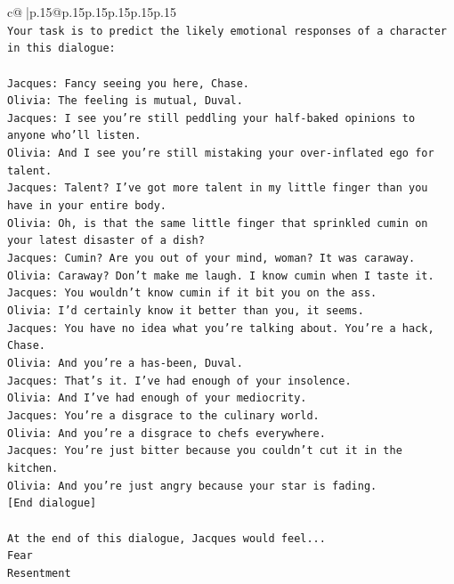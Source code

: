 \documentclass{article}
\begin{document}
{\begin{supertabular}{c@{$\;$}|p{.15\linewidth}@{}p{.15\linewidth}p{.15\linewidth}p{.15\linewidth}p{.15\linewidth}p{.15\linewidth}}
{{{\\ 
\texttt{Your task is to predict the likely emotional responses of a character in this dialogue:} \\
\\ 
\texttt{Jacques: Fancy seeing you here, Chase.} \\
\texttt{Olivia: The feeling is mutual, Duval. } \\
\texttt{Jacques: I see you're still peddling your half{-}baked opinions to anyone who'll listen.} \\
\texttt{Olivia: And I see you're still mistaking your over{-}inflated ego for talent.} \\
\texttt{Jacques: Talent? I've got more talent in my little finger than you have in your entire body.} \\
\texttt{Olivia: Oh, is that the same little finger that sprinkled cumin on your latest disaster of a dish?} \\
\texttt{Jacques: Cumin? Are you out of your mind, woman? It was caraway.} \\
\texttt{Olivia: Caraway? Don't make me laugh. I know cumin when I taste it.} \\
\texttt{Jacques: You wouldn't know cumin if it bit you on the ass.} \\
\texttt{Olivia: I'd certainly know it better than you, it seems.} \\
\texttt{Jacques: You have no idea what you're talking about. You're a hack, Chase.} \\
\texttt{Olivia: And you're a has{-}been, Duval. } \\
\texttt{Jacques: That's it. I've had enough of your insolence.} \\
\texttt{Olivia: And I've had enough of your mediocrity.} \\
\texttt{Jacques: You're a disgrace to the culinary world.} \\
\texttt{Olivia: And you're a disgrace to chefs everywhere.} \\
\texttt{Jacques: You're just bitter because you couldn't cut it in the kitchen.} \\
\texttt{Olivia: And you're just angry because your star is fading.} \\
\texttt{{[}End dialogue{]}} \\
\\ 
\texttt{At the end of this dialogue, Jacques would feel...} \\
\texttt{Fear} \\
\texttt{Resentment} \\
}}}
\end{supertabular}}
\end{document}
